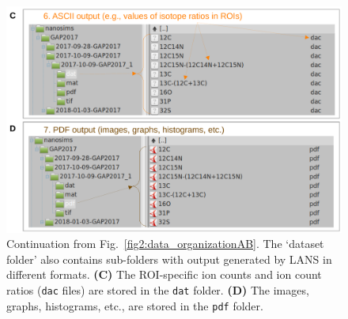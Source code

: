 \documentclass[a4paper, 11pt]{article}
\newcommand{\ttt}[1]{\texttt{#1}}
\newcounter{step}
\begin{document}
\begin{figure}[ht]
\centering
\includegraphics[width=\textwidth]{figs2/folders_organizationCD}
\caption{\label{fig2:data_organizationCD}%
  Continuation from Fig.~\ref{fig2:data_organizationAB}. %
The `dataset folder' also contains sub-folders with output generated by LANS in different formats. %
    \textbf{(C)} The ROI-specific ion counts and ion count ratios (\ttt{dac} files) are stored in the \ttt{dat} folder. %
    \textbf{(D)} The images, graphs, histograms, etc., are stored in the \ttt{pdf} folder.}
\end{figure}


\end{document}
